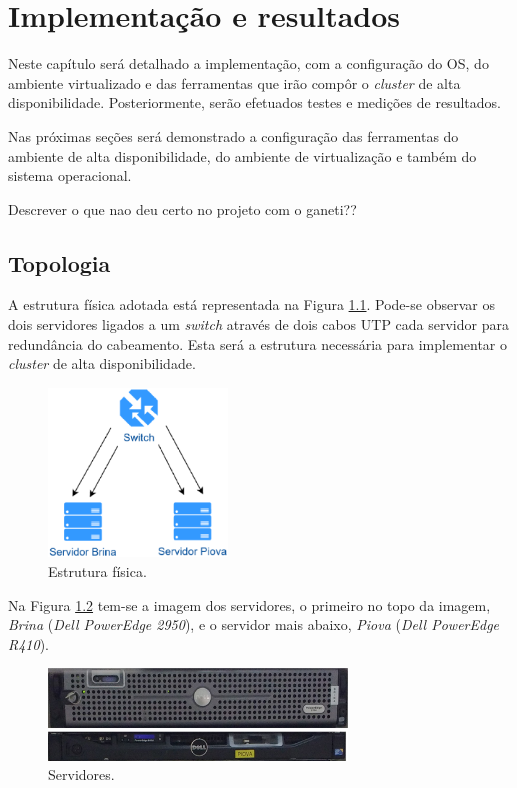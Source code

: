 \chapter{Implementação e resultados}
\label{cap:implementacaoresultados}

Neste capítulo será detalhado a implementação, com a configuração do \ac{OS}, do ambiente virtualizado e das ferramentas que irão compôr o
\textit{cluster} de alta disponibilidade. Posteriormente, serão efetuados testes e medições de resultados.

Nas próximas seções será demonstrado a configuração das ferramentas do ambiente de alta disponibilidade, do ambiente de virtualização e 
também do sistema operacional.

Descrever o que nao deu certo no projeto com o ganeti??

\section{Topologia}

A estrutura física adotada está representada na Figura \ref{fig:projeto_fisico}.
Pode-se observar os dois servidores ligados a um \textit{switch} através de dois cabos UTP cada servidor para redundância do cabeamento.
Esta será a estrutura necessária para implementar o \textit{cluster} de alta disponibilidade.

\begin{figure}[h!]
 \centering
 \includegraphics[width=180px]{img/projeto_fisico.eps}
 \caption{Estrutura física.}
 \label{fig:projeto_fisico}
\end{figure}

Na Figura \ref{fig:servidores_brina_piova} tem-se a imagem dos servidores, o primeiro no topo da imagem, \textit{Brina} 
(\textit{Dell PowerEdge 2950}), e o servidor mais abaixo, \textit{Piova} (\textit{Dell PowerEdge R410}).

\begin{figure}[h!]
 \centering
 \includegraphics[width=300px]{img/servidores_brina_piova.eps}
 \caption{Servidores.}
 \label{fig:servidores_brina_piova}
\end{figure}

